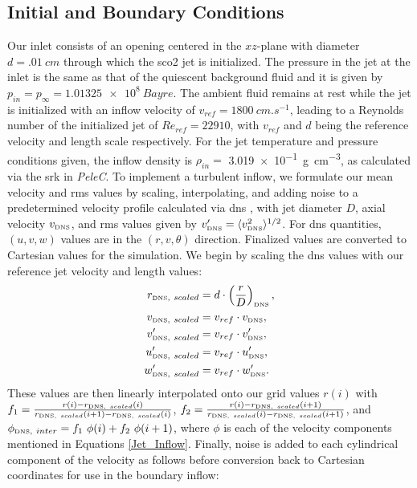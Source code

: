 \subsection{Initial and Boundary Conditions}
Our inlet consists of an opening centered in the $xz$-plane with diameter $d=\SI{.01}{cm}$ through which the \gls{sco2} jet is initialized. The pressure in the jet at the inlet is the same as that of the quiescent background fluid and it is given by $p_{in}=p_{\infty}=\SI{1.01325e+8}{Bayre}$. The ambient fluid remains at rest while the jet is initialized with an inflow velocity of $v_{ref} = \SI{1800}{cm.s^{-1}}$, leading to a Reynolds number of the initialized jet of $Re_{ref} = 22910$, with $v_{ref}$ and $d$ being the reference velocity and length scale respectively. For the jet temperature and pressure conditions given, the inflow density is $\rho_{in}=$ \SI{3.019e-1}{g.cm^{-3}}, as calculated via the \gls{srk} in \textit{PeleC}. To implement a turbulent inflow, we formulate our mean velocity and \gls{rms} values by scaling, interpolating, and adding noise to a predetermined velocity profile calculated via \gls{dns} \cite{DNS}, with jet diameter $D$, axial velocity $v_{\text{\tiny{DNS}}}$, and \gls{rms} values given by $v^{\prime}_{\text{\tiny{DNS}}} =  \langle v_{\text{\tiny{DNS}}}^2 \rangle ^{1/2}$. For \gls{dns} quantities, $(u,v,w)$ values are in the $(r,v,\theta)$ direction. Finalized values are converted to Cartesian values for the simulation. We begin by scaling the \gls{dns} values with our reference jet velocity and length values:
\begin{subequations} \label{Jet_Inflow}
	\begin{align}
		r_{\text{\tiny{DNS}},\ scaled} &= d \cdot \left( \dfrac{r}{D} \right)_{\text{\tiny{DNS}}}, \\
		v_{\text{\tiny{DNS}},\ scaled} &=  v_{ref} \cdot v_{\text{\tiny{DNS}}}, \\
		v^{\prime}_{\text{\tiny{DNS}},\ scaled} &=  v_{ref} \cdot v^{\prime}_{\text{\tiny{DNS}}}, \\
		u^{\prime}_{\text{\tiny{DNS}},\ scaled} &=   v_{ref} \cdot u^{\prime}_{\text{\tiny{DNS}}}, \\
		w^{\prime}_{\text{\tiny{DNS}},\ scaled} &=   v_{ref} \cdot w^{\prime}_{\text{\tiny{DNS}}}. 
	\end{align}
\end{subequations}  
These values are then linearly interpolated onto our grid values $r(i)$ with $f_1 = \tfrac{r(i) - r_{\text{\tiny{DNS}},\ scaled}(i) }{r_{\text{\tiny{DNS}},\ scaled}(i+1) - r_{\text{\tiny{DNS}},\ scaled}(i)}$, $f_2 = \tfrac{r(i) - r_{\text{\tiny{DNS}},\ scaled}(i+1) }{r_{\text{\tiny{DNS}},\ scaled}(i) - r_{\text{\tiny{DNS}},\ scaled}(i+1)}$, and $\phi_{\text{\tiny{DNS}},\ inter} = f_1\ \phi(i) + f_2\ \phi(i+1)$, where $\phi$ is each of the velocity components mentioned in Equations \eqref{Jet_Inflow}. Finally, noise is added to each cylindrical component of the velocity as follows before conversion back to Cartesian coordinates for use in the boundary inflow:
